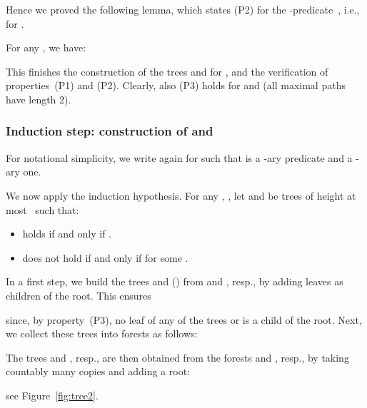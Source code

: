 \documentclass[envcountsame]{llncs}
\begin{document}
Hence we proved the following lemma, which states
(P2) for the -predicate~, i.e., for .

\begin{lemma}\label{lem:tree_2_bad}
  For any , we have:
  
\end{lemma}
This finishes the construction of the trees  and
 for , and the verification
of properties~(P1) and (P2).
Clearly, also (P3) holds for  and
 (all maximal paths have length 2).

\subsubsection{Induction step: construction of 
and  } \label{sec-induction-trees}

For notational simplicity, we write again  for  such
that  is a -ary predicate and  a -ary one.


We now apply the induction hypothesis. For any
, , 
let  and
 be trees of height at most~
such that:
\begin{itemize}
\item  holds if and only if
  .
\item  does not hold if and only if
   for some .
\end{itemize}
In a first step, we build the trees  and
 () from 
and , resp., by adding  leaves as
children of the root. This ensures

since, by property~(P3), no leaf of any of the trees  or  is a child of the
root. Next, we collect these trees into forests as follows:

The trees  and , resp., are then obtained from
the forests  and , resp., by
taking countably many copies and adding a root:

see Figure~\ref{fig:tree2}.
\end{document}
